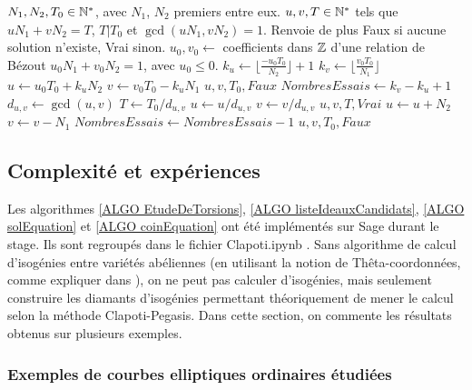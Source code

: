 \begin{algorithm}[H]
	\caption{Solution d'équation de pièces}\label{ALGO coinEquation}
	\begin{algorithmic}[1]
		\Require $N_1, N_2, T_{0}\in\mathbb{N}^*$, avec $N_1$, $N_2$ premiers entre eux. 
		\Ensure $u,v,T\in\mathbb{N}^*$ tels que $uN_1 + vN_2 = T$, $T|T_{0}$ et $\gcd(uN_1, vN_2) = 1$. Renvoie de plus Faux si aucune solution n'existe, Vrai sinon.  
		\State $u_0, v_0\gets$ coefficients dans $\mathbb{Z}$ d'une relation de Bézout $u_0N_1+v_0N_2 = 1$, avec $u_0\leq0$.
		\State $k_u\gets\lfloor \frac{-u_0T_{0}}{N_2}\rfloor + 1$
		\State $k_v\gets\lfloor\frac{v_0T_{0}}{N_1}\rfloor$
		\State $u\gets u_0T_{0} + k_uN_2$
		\State $v\gets v_0T_{0} - k_uN_1$
		\State \Return $u, v, T_{0}, Faux$
		\EndIf
		\State $NombresEssais\gets k_v - k_u + 1$
		\State $d_{u,v}\gets\gcd(u,v)$
		\State $T \gets T_{0}/d_{u,v}$
		\State $u \gets u / d_{u,v}$
		\State $v \gets v / d_{u,v}$
		\State\Return $u,v,T,Vrai$
		\EndIf
		\EndIf
		\State $u\gets u + N_2$
		\State $v\gets v - N_1$
		\State $NombresEssais\gets NombresEssais - 1$
		\EndWhile
		\State \Return $u,v,T_{0},Faux$
	\end{algorithmic}
\end{algorithm}

\subsection{Complexité et expériences}\label{SECTION experiences}

Les algorithmes \ref{ALGO EtudeDeTorsions}, \ref{ALGO listeIdeauxCandidats}, \ref{ALGO solEquation} et \ref{ALGO coinEquation} ont été implémentés sur Sage durant le stage. Ils sont regroupés dans le fichier Clapoti.ipynb \cite{GITHUBRapportStage}. Sans algorithme de calcul d'isogénies entre variétés abéliennes (en utilisant la notion de Thêta-coordonnées, comme expliquer dans \cite{ThetaRobert}), on ne peut pas calculer d'isogénies, mais seulement construire les diamants d'isogénies permettant théoriquement de mener le calcul selon la méthode Clapoti-Pegasis. Dans cette section, on commente les résultats obtenus sur plusieurs exemples. 

\subsubsection{Exemples de courbes elliptiques ordinaires étudiées}

